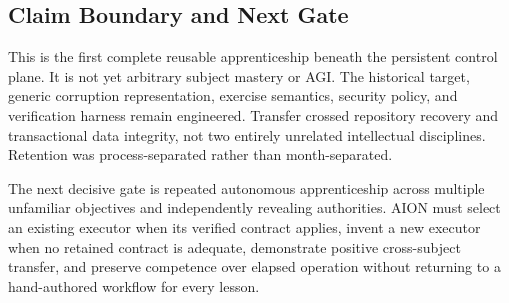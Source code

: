 \subsection{Claim Boundary and Next Gate}
\label{subsec:general-apprenticeship-executor-boundary}

This is the first complete reusable apprenticeship beneath the persistent
control plane.  It is not yet arbitrary subject mastery or AGI.  The historical
target, generic corruption representation, exercise semantics, security policy,
and verification harness remain engineered.  Transfer crossed repository
recovery and transactional data integrity, not two entirely unrelated
intellectual disciplines.  Retention was process-separated rather than
month-separated.

The next decisive gate is repeated autonomous apprenticeship across multiple
unfamiliar objectives and independently revealing authorities.  AION must
select an existing executor when its verified contract applies, invent a new
executor when no retained contract is adequate, demonstrate positive
cross-subject transfer, and preserve competence over elapsed operation without
returning to a hand-authored workflow for every lesson.

